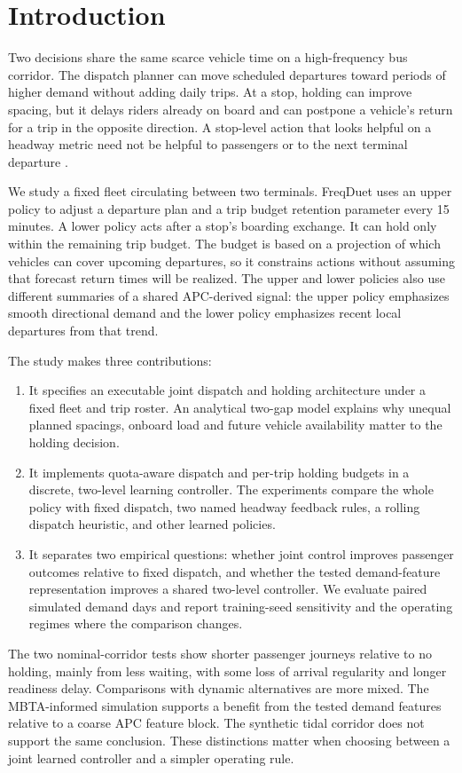 \section{Introduction}
\label{sec:intro}

Two decisions share the same scarce vehicle time on a high-frequency bus corridor. The dispatch planner can move scheduled departures toward periods of higher demand without adding daily trips. At a stop, holding can improve spacing, but it delays riders already on board and can postpone a vehicle's return for a trip in the opposite direction. A stop-level action that looks helpful on a headway metric need not be helpful to passengers or to the next terminal departure \citep{osuna1972control,daganzo2009headway,berrebi2018comparing}.

We study a fixed fleet circulating between two terminals. FreqDuet uses an upper policy to adjust a departure plan and a trip budget retention parameter every 15 minutes. A lower policy acts after a stop's boarding exchange. It can hold only within the remaining trip budget. The budget is based on a projection of which vehicles can cover upcoming departures, so it constrains actions without assuming that forecast return times will be realized. The upper and lower policies also use different summaries of a shared APC-derived signal: the upper policy emphasizes smooth directional demand and the lower policy emphasizes recent local departures from that trend.

The study makes three contributions:
\begin{enumerate}
  \item It specifies an executable joint dispatch and holding architecture under a fixed fleet and trip roster. An analytical two-gap model explains why unequal planned spacings, onboard load and future vehicle availability matter to the holding decision.
  \item It implements quota-aware dispatch and per-trip holding budgets in a discrete, two-level learning controller. The experiments compare the whole policy with fixed dispatch, two named headway feedback rules, a rolling dispatch heuristic, and other learned policies.
  \item It separates two empirical questions: whether joint control improves passenger outcomes relative to fixed dispatch, and whether the tested demand-feature representation improves a shared two-level controller. We evaluate paired simulated demand days and report training-seed sensitivity and the operating regimes where the comparison changes.
\end{enumerate}

The two nominal-corridor tests show shorter passenger journeys relative to no holding, mainly from less waiting, with some loss of arrival regularity and longer readiness delay. Comparisons with dynamic alternatives are more mixed. The MBTA-informed simulation supports a benefit from the tested demand features relative to a coarse APC feature block. The synthetic tidal corridor does not support the same conclusion. These distinctions matter when choosing between a joint learned controller and a simpler operating rule.
